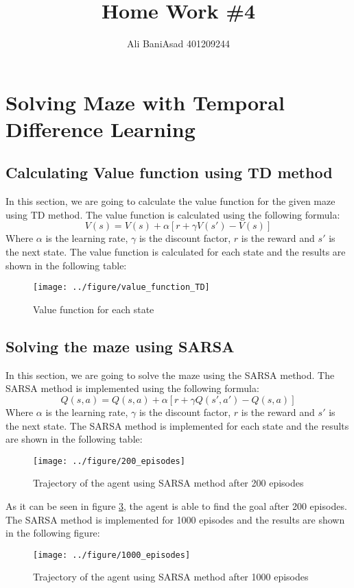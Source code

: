 \documentclass{article}
\title{Home Work \#4}
\author{Ali BaniAsad 401209244}
\begin{document}
	\maketitle
	\section{Solving Maze with Temporal Difference Learning}
	\subsection{Calculating Value function using TD method}
	In this section, we are going to calculate the value function for the given maze using TD method. The value function is calculated using the following formula:
	\begin{equation}
		V(s) = V(s) + \alpha [r + \gamma V(s') - V(s)]
	\end{equation}
	Where $\alpha$ is the learning rate, $\gamma$ is the discount factor, $r$ is the reward and $s'$ is the next state. The value function is calculated for each state and the results are shown in the following table:
	\begin{figure}[H]
		\centering
		\texttt{[image: ../figure/value\_function\_TD]}
		\caption{Value function for each state}
		\label{fig:tdvaluefunction}
	\end{figure}

	\subsection{Solving the maze using SARSA}
	In this section, we are going to solve the maze using the SARSA method. The SARSA method is implemented using the following formula:
	\begin{equation}
		Q(s,a) = Q(s,a) + \alpha [r + \gamma Q(s',a') - Q(s,a)]
	\end{equation}
	Where $\alpha$ is the learning rate, $\gamma$ is the discount factor, $r$ is the reward and $s'$ is the next state. The SARSA method is implemented for each state and the results are shown in the following table:
	\begin{figure}[H]
		\centering
		\texttt{[image: ../figure/200\_episodes]}
		\caption{Trajectory of the agent using SARSA method after 200 episodes}
		\label{fig:sarsa}
	\end{figure}
	As it can be seen in figure \ref{fig:sarsa}, the agent is able to find the goal after 200 episodes. The SARSA method is implemented for 1000 episodes and the results are shown in the following figure:
	\begin{figure}[H]
		\centering
		\texttt{[image: ../figure/1000\_episodes]}
		\caption{Trajectory of the agent using SARSA method after 1000 episodes}
		\label{fig:sarsa}
	\end{figure}
\end{document}
